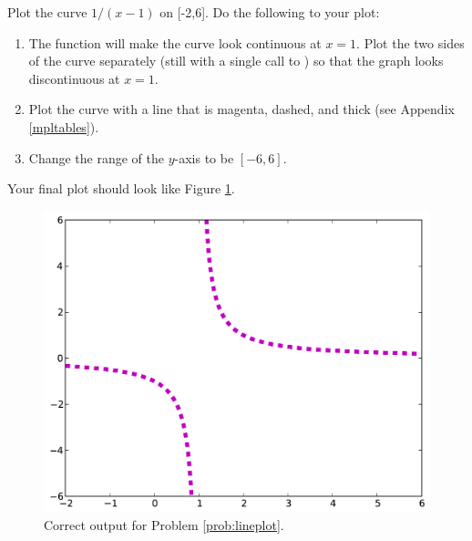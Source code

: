 \begin{problem}\label{prob:lineplot}
Plot the curve $1/(x-1)$ on [-2,6].
Do the following to your plot:

\begin{enumerate}
\item The function  will make the curve look continuous at $x=1$.
Plot the two sides of the curve separately (still with a single call to ) so that the graph looks discontinuous at $x=1$.
\item Plot the curve with a line that is magenta, dashed, and thick (see Appendix \ref{mpltables}).
\item Change the range of the $y$-axis to be $[-6, 6]$.
\end{enumerate}
Your final plot should look like Figure \ref{fig:problem2}.

\begin{figure}[H]
\includegraphics[width=.7\textwidth]{soln2.pdf}
\caption{Correct output for Problem \ref{prob:lineplot}.}
\label{fig:problem2}
\end{figure}
\end{problem}

